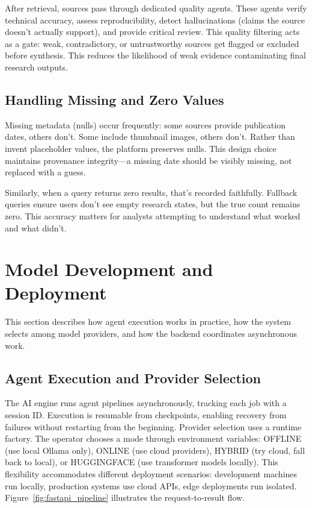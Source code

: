 \documentclass[12pt, a4paper]{article}
\begin{document}
After retrieval, sources pass through dedicated quality agents. These agents verify technical
accuracy, assess reproducibility, detect hallucinations (claims the source doesn't actually
support), and provide critical review. This quality filtering acts as a gate: weak,
contradictory, or untrustworthy sources get flagged or excluded before synthesis. This reduces
the likelihood of weak evidence contaminating final research outputs.

\subsection{Handling Missing and Zero Values}

Missing metadata (nulls) occur frequently: some sources provide publication dates, others don't.
Some include thumbnail images, others don't. Rather than invent placeholder values, the
platform preserves nulls. This design choice maintains provenance integrity---a missing date
should be visibly missing, not replaced with a guess.

Similarly, when a query returns zero results, that's recorded faithfully. Fallback queries
ensure users don't see empty research states, but the true count remains zero. This accuracy
matters for analysts attempting to understand what worked and what didn't.

\section{Model Development and Deployment}

This section describes how agent execution works in practice, how the system selects among
model providers, and how the backend coordinates asynchronous work.

\subsection{Agent Execution and Provider Selection}

The AI engine runs agent pipelines asynchronously, tracking each job with a session ID.
Execution is resumable from checkpoints, enabling recovery from failures without restarting
from the beginning. Provider selection uses a runtime factory. The operator chooses a mode
through environment variables: OFFLINE (use local Ollama only), ONLINE (use cloud providers),
HYBRID (try cloud, fall back to local), or HUGGINGFACE (use transformer models locally).
This flexibility accommodates different deployment scenarios: development machines run locally,
production systems use cloud APIs, edge deployments run isolated.
Figure~\ref{fig:fastapi_pipeline} illustrates the request-to-result flow.
\end{document}

